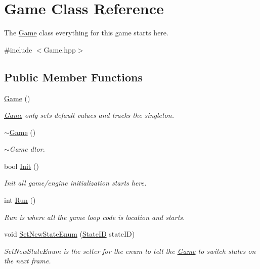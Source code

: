 \hypertarget{class_game}{\section{Game Class Reference}
\label{class_game}
}


The \hyperlink{class_game}{Game} class everything for this game starts here.  




{\ttfamily \#include $<$Game.\-hpp$>$}

\subsection*{Public Member Functions}
\begin{DoxyCompactItemize}
\item 
\hyperlink{class_game_ad59df6562a58a614fda24622d3715b65}{Game} ()
\begin{DoxyCompactList}\small\item\em \hyperlink{class_game}{Game} only sets default values and tracks the singleton. \end{DoxyCompactList}\item 
\hyperlink{class_game_ae3d112ca6e0e55150d2fdbc704474530}{$\sim$\-Game} ()
\begin{DoxyCompactList}\small\item\em $\sim$\-Game dtor. \end{DoxyCompactList}\item 
bool \hyperlink{class_game_ab19596de871e7ce3ce5effc888c2a30b}{Init} ()
\begin{DoxyCompactList}\small\item\em Init all game/engine initialization starts here. \end{DoxyCompactList}\item 
int \hyperlink{class_game_a1880d9816a978b82bb91e4679743173d}{Run} ()
\begin{DoxyCompactList}\small\item\em Run is where all the game loop code is location and starts. \end{DoxyCompactList}\item 
void \hyperlink{class_game_a3b857f0272cf7d87010b8d95cd303e61}{Set\-New\-State\-Enum} (\hyperlink{_state_8hpp_a905494cc15ee9757a813dbfe4b1072fe}{State\-I\-D} state\-I\-D)
\begin{DoxyCompactList}\small\item\em Set\-New\-State\-Enum is the setter for the enum to tell the \hyperlink{class_game}{Game} to switch states on the next frame. \end{DoxyCompactList}\item 

\end{DoxyCompactItemize}
